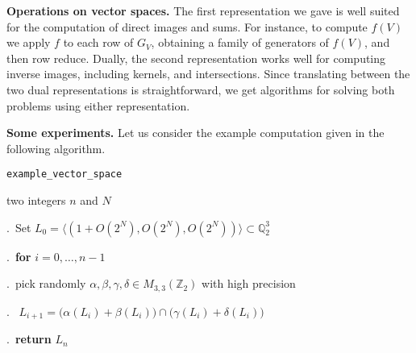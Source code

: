 \documentclass{sig-alternate}
\newcommand{\Z}{\mathbb Z}
\newcommand{\Q}{\mathbb Q}
\begin{document}
\smallskip

\noindent
{\bf Operations on vector spaces.}
The first representation we gave is well suited for the computation
of direct images and sums. For instance, to compute $f(V)$
we apply $f$ to each row of $G_V$, obtaining a
family of generators of $f(V)$, and then row reduce. Dually, the
second representation works well for computing inverse images, including 
kernels, and intersections. Since translating between the two dual
representations is straightforward, we get algorithms for solving both
problems using either representation.


\smallskip

\noindent
{\bf Some experiments.}
Let us consider the example computation given in the following
algorithm.

\noindent\hrulefill

 {\tt example\_vector\_space}

 two integers $n$ and $N$

\smallskip

.\ Set $L_0 = \langle (1 + O(2^N),  O(2^N), O(2^N)) \rangle
\subset \Q_2^3$

.\ {\bf for} $i=0,\dots,n-1$

.\ \hspace{0.3cm}pick randomly $\alpha, \beta, \gamma, \delta
\in M_{3,3}(\Z_2)$ with high precision

.\ \hspace{0.3cm}{\bf compute} $L_{i+1} = 
\big(\alpha(L_i) + \beta(L_i)\big) \cap \big(\gamma(L_i) + \delta(L_i)\big)$

.\ {\bf return} $L_n$

\vspace{-1ex}\noindent\hrulefill

\medskip
\end{document}

